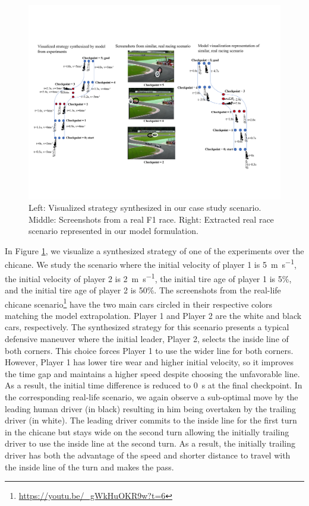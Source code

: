 \begin{figure}
\includegraphics[height=0.8\textwidth, width=\textheight]{Figures/ChicaneViz.pdf}
    \caption[Synthesized strategy compared to real-life scenario on a chicane.]{Left: Visualized strategy synthesized in our case study scenario. Middle: Screenshots from a real F1 race. Right: Extracted real race scenario represented in our model formulation.}
    \label{fig:ch}
\end{figure}

In Figure \ref{fig:ch}, we visualize a synthesized strategy of one of the experiments over the chicane. We study the scenario where the initial velocity of player 1 is \SI{5}{\meter\per\second}, the initial velocity of player 2 is \SI{2}{\meter\per\second}, the initial tire age of player 1 is 5\%, and the initial tire age of player 2 is 50\%. The screenshots from the real-life chicane scenario\footnote{\label{chicanenote}\url{https://youtu.be/_gWkHuOKR9w?t=6}} have the two main cars circled in their respective colors matching the model extrapolation. Player 1 and Player 2 are the white and black cars, respectively. The synthesized strategy for this scenario presents a typical defensive maneuver where the initial leader, Player 2, selects the inside line of both corners. This choice forces Player 1 to use the wider line for both corners. However, Player 1 has lower tire wear and higher initial velocity, so it improves the time gap and maintains a higher speed despite choosing the unfavorable line. As a result, the initial time difference is reduced to \SI{0}{\second} at the final checkpoint. In the corresponding real-life scenario, we again observe a sub-optimal move by the leading human driver (in black) resulting in him being overtaken by the trailing driver (in white). The leading driver commits to the inside line for the first turn in the chicane but stays wide on the second turn allowing the initially trailing driver to use the inside line at the second turn. As a result, the initially trailing driver has both the advantage of the speed and shorter distance to travel with the inside line of the turn and makes the pass.  

